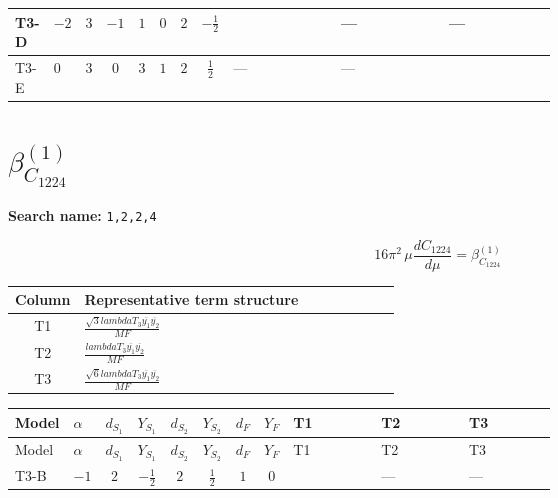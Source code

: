 \documentclass[8pt]{article}
\begin{document}
\begin{landscape}
\begin{longtable}{@{}llcccccc >{\raggedright\arraybackslash}p{0.21\linewidth} >{\raggedright\arraybackslash}p{0.21\linewidth} >{\raggedright\arraybackslash}p{0.21\linewidth}@{}}
\midrule
T3-D & $-2$ & $3$ & $-1$ & $1$ & $0$ & $2$ & $-\frac{1}{2}$ & \scriptsize\adjustbox{max width=\linewidth}{$\begin{gathered} - \frac{\sqrt{3} i lambdaT_{3} \overline{y_{1}} \overline{y_{2}}}{3 MF}\end{gathered}$} & --- & --- \\
\midrule
T3-E & $0$ & $3$ & $0$ & $3$ & $1$ & $2$ & $\frac{1}{2}$ & --- & --- & \scriptsize\adjustbox{max width=\linewidth}{$\begin{gathered} \frac{\sqrt{6} i lambdaT_{3} \overline{y_{1}} \overline{y_{2}}}{3 MF}\end{gathered}$} \\
\midrule
\bottomrule
\end{longtable}
\clearpage
\section*{$\beta_{C_{1224}}^{(1)}$}
\noindent\textbf{Search name: }\texttt{1,2,2,4}\par\smallskip
\[16\pi^2\,\mu\frac{d C_{1224}}{d\mu}=\beta_{C_{1224}}^{(1)}\]
\begin{center}
\begin{tabular}{@{}c >{\raggedright\arraybackslash}p{0.82\linewidth}@{}}
\toprule
Column & Representative term structure \\
\midrule
T1 & \(\displaystyle \frac{\sqrt{3} lambdaT_{3} \overline{y_{1}} \overline{y_{2}}}{MF}\) \\
\midrule
T2 & \(\displaystyle \frac{lambdaT_{3} \overline{y_{1}} \overline{y_{2}}}{MF}\) \\
\midrule
T3 & \(\displaystyle \frac{\sqrt{6} lambdaT_{3} \overline{y_{1}} \overline{y_{2}}}{MF}\) \\
\midrule
\bottomrule
\end{tabular}
\end{center}
\smallskip
\tiny
\begin{longtable}{@{}llcccccc >{\raggedright\arraybackslash}p{0.21\linewidth} >{\raggedright\arraybackslash}p{0.21\linewidth} >{\raggedright\arraybackslash}p{0.21\linewidth}@{}}
\toprule
Model & $\alpha$ & $d_{S_1}$ & $Y_{S_1}$ & $d_{S_2}$ & $Y_{S_2}$ & $d_F$ & $Y_F$ & T1 & T2 & T3 \\
\midrule
\endfirsthead
\toprule
Model & $\alpha$ & $d_{S_1}$ & $Y_{S_1}$ & $d_{S_2}$ & $Y_{S_2}$ & $d_F$ & $Y_F$ & T1 & T2 & T3 \\
\midrule
\endhead
T3-B & $-1$ & $2$ & $-\frac{1}{2}$ & $2$ & $\frac{1}{2}$ & $1$ & $0$ & \scriptsize\adjustbox{max width=\linewidth}{$\begin{gathered} \frac{\sqrt{3} lambdaT_{3} \overline{y_{1}} \overline{y_{2}}}{3 MF}\end{gathered}$} & --- & --- \\

\end{longtable}
\end{landscape}
\end{document}
